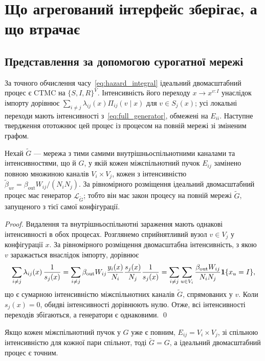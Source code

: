 \clearpage
\section{Що агрегований інтерфейс зберігає, а що втрачає}
\label{sec:analysis}

\subsection{Представлення за допомогою сурогатної мережі}
\label{sec:surrogate}

За точного обчислення часу~\eqref{eq:hazard_integral} ідеальний двомасштабний процес є CTMC на $\{S,I,R\}^V$. Інтенсивність його переходу $x\to x^{v:I}$ унаслідок імпорту дорівнює $\sum_{i\neq j}\lambda_{ij}(x)\Pi_{ij}(v\mid x)$ для $v\in S_j(x)$; усі локальні переходи мають інтенсивності з~\eqref{eq:full_generator}, обмежені на $E_{ii}$. Наступне твердження ототожнює цей процес із процесом на повній мережі зі зміненим графом.

\begin{proposition}
\label{prop:surrogate}
Нехай $\tilde G$ --- мережа з тими самими внутрішньоспільнотними каналами та інтенсивностями, що й $G$, у якій кожен міжспільнотний пучок $E_{ij}$ замінено повною множиною каналів $V_i\times V_j$, кожен з інтенсивністю $\tilde\beta_{uv}=\beta_{\mathrm{out}}W_{ij}/(N_iN_j)$. За рівномірного розміщення ідеальний двомасштабний процес має генератор $\mathcal{L}_{\tilde G}$; тобто він має закон процесу на повній мережі $\tilde G$, запущеного з тієї самої конфігурації.
\end{proposition}

\begin{proof}
Видалення та внутрішньоспільнотні зараження мають однакові інтенсивності в обох процесах. Розглянемо сприйнятливий вузол $v\in V_j$ у конфігурації $x$. За рівномірного розміщення двомасштабна інтенсивність, з якою $v$ заражається внаслідок імпорту, дорівнює
\[
\sum_{i\neq j}\lambda_{ij}(x)\,\frac{1}{s_j(x)}
=\sum_{i\neq j}\beta_{\mathrm{out}}W_{ij}\frac{y_i(x)}{N_i}\frac{s_j(x)}{N_j}\frac{1}{s_j(x)}
=\sum_{i\neq j}\sum_{u\in V_i}\frac{\beta_{\mathrm{out}}W_{ij}}{N_iN_j}\mathbf{1}\{x_u=I\},
\]
що є сумарною інтенсивністю міжспільнотних каналів $\tilde G$, спрямованих у $v$. Коли $s_j(x)=0$, обидві інтенсивності дорівнюють нулю. Отже, всі інтенсивності переходів збігаються, а генератори є однаковими. \qed
\end{proof}

\begin{corollary}
\label{cor:exact}
Якщо кожен міжспільнотний пучок у $G$ уже є повним, $E_{ij}=V_i\times V_j$, зі спільною інтенсивністю для кожної пари спільнот, тоді $\tilde G=G$, а ідеальний двомасштабний процес є точним.
\end{corollary}

